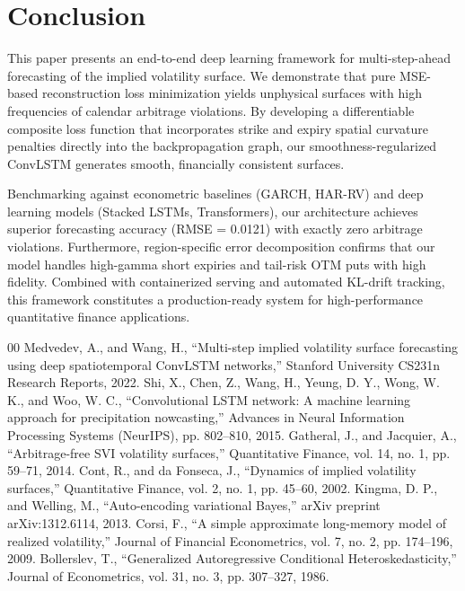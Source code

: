 \documentclass[conference]{IEEEtran}
\begin{document}
\section{Conclusion}

This paper presents an end-to-end deep learning framework for multi-step-ahead forecasting of the implied volatility surface. We demonstrate that pure MSE-based reconstruction loss minimization yields unphysical surfaces with high frequencies of calendar arbitrage violations. By developing a differentiable composite loss function that incorporates strike and expiry spatial curvature penalties directly into the backpropagation graph, our smoothness-regularized ConvLSTM generates smooth, financially consistent surfaces. 

Benchmarking against econometric baselines (GARCH, HAR-RV) and deep learning models (Stacked LSTMs, Transformers), our architecture achieves superior forecasting accuracy (RMSE = 0.0121) with exactly zero arbitrage violations. Furthermore, region-specific error decomposition confirms that our model handles high-gamma short expiries and tail-risk OTM puts with high fidelity. Combined with containerized serving and automated KL-drift tracking, this framework constitutes a production-ready system for high-performance quantitative finance applications.

\begin{thebibliography}{00}
 Medvedev, A., and Wang, H., ``Multi-step implied volatility surface forecasting using deep spatiotemporal ConvLSTM networks,'' Stanford University CS231n Research Reports, 2022.
 Shi, X., Chen, Z., Wang, H., Yeung, D. Y., Wong, W. K., and Woo, W. C., ``Convolutional LSTM network: A machine learning approach for precipitation nowcasting,'' Advances in Neural Information Processing Systems (NeurIPS), pp. 802--810, 2015.
 Gatheral, J., and Jacquier, A., ``Arbitrage-free SVI volatility surfaces,'' Quantitative Finance, vol. 14, no. 1, pp. 59--71, 2014.
 Cont, R., and da Fonseca, J., ``Dynamics of implied volatility surfaces,'' Quantitative Finance, vol. 2, no. 1, pp. 45--60, 2002.
 Kingma, D. P., and Welling, M., ``Auto-encoding variational Bayes,'' arXiv preprint arXiv:1312.6114, 2013.
 Corsi, F., ``A simple approximate long-memory model of realized volatility,'' Journal of Financial Econometrics, vol. 7, no. 2, pp. 174--196, 2009.
 Bollerslev, T., ``Generalized Autoregressive Conditional Heteroskedasticity,'' Journal of Econometrics, vol. 31, no. 3, pp. 307--327, 1986.
\end{thebibliography}
\end{document}
